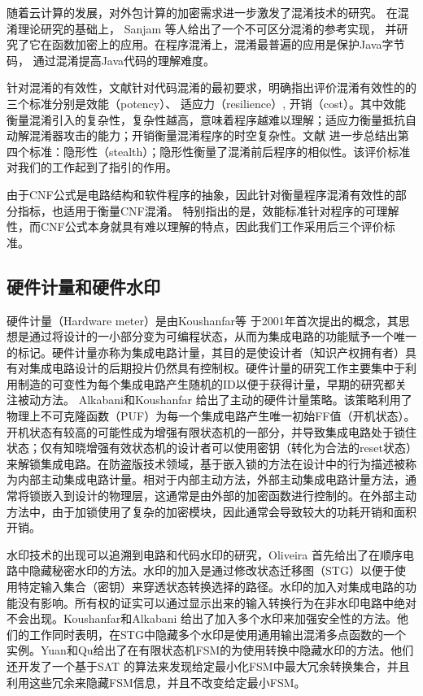 随着云计算的发展，对外包计算的加密需求进一步激发了混淆技术的研究。
在混淆理论研究的基础上，
Sanjam 等人给出了一个不可区分混淆的参考实现，
并研究了它在函数加密上的应用。在程序混淆上，混淆最普遍的应用是保护Java字节码，
通过混淆提高Java代码的理解难度。

针对混淆的有效性，文献针对代码混淆的最初要求，明确指出评价混淆有效性的的三个标准分别是效能（potency）、 适应力（resilience）, 开销（cost）。其中效能衡量混淆引入的复杂性，复杂性越高，意味着程序越难以理解；适应力衡量抵抗自动解混淆器攻击的能力；开销衡量混淆程序的时空复杂性。文献 进一步总结出第四个标准：隐形性（stealth）；隐形性衡量了混淆前后程序的相似性。该评价标准对我们的工作起到了指引的作用。

由于CNF公式是电路结构和软件程序的抽象，因此针对衡量程序混淆有效性的部分指标，也适用于衡量CNF混淆。
特别指出的是，效能标准针对程序的可理解性，而CNF公式本身就具有难以理解的特点，因此我们工作采用后三个评价标准。

\subsection{硬件计量和硬件水印}

硬件计量（Hardware meter）是由Koushanfar等 于2001年首次提出的概念，其思想是通过将设计的一小部分变为可编程状态，从而为集成电路的功能赋予一个唯一的标记。硬件计量亦称为集成电路计量，其目的是使设计者（知识产权拥有者）具有对集成电路设计的后期投片仍然具有控制权。硬件计量的研究工作主要集中于利用制造的可变性为每个集成电路产生随机的ID以便于获得计量，早期的研究都关注被动方法。
Alkabani和Koushanfar 给出了主动的硬件计量策略。该策略利用了物理上不可克隆函数（PUF）为每一个集成电路产生唯一初始FF值（开机状态）。开机状态有较高的可能性成为增强有限状态机的一部分，并导致集成电路处于锁住状态；仅有知晓增强有效状态机的设计者可以使用密钥（转化为合法的reset状态）来解锁集成电路。在防盗版技术领域，基于嵌入锁的方法在设计中的行为描述被称为内部主动集成电路计量。相对于内部主动方法，外部主动集成电路计量方法，通常将锁嵌入到设计的物理层，这通常是由外部的加密函数进行控制的。在外部主动方法中，由于加锁使用了复杂的加密模块，因此通常会导致较大的功耗开销和面积开销。

水印技术的出现可以追溯到电路和代码水印的研究，Oliveira 首先给出了在顺序电路中隐藏秘密水印的方法。水印的加入是通过修改状态迁移图（STG）以便于使用特定输入集合（密钥）来穿透状态转换选择的路径。水印的加入对集成电路的功能没有影响。所有权的证实可以通过显示出来的输入转换行为在非水印电路中绝对不会出现。Koushanfar和Alkabani 给出了加入多个水印来加强安全性的方法。他们的工作同时表明，在STG中隐藏多个水印是使用通用输出混淆多点函数的一个实例。Yuan和Qu给出了在有限状态机FSM的为使用转换中隐藏水印的方法。他们还开发了一个基于SAT 的算法来发现给定最小化FSM中最大冗余转换集合，并且利用这些冗余来隐藏FSM信息，并且不改变给定最小FSM。

